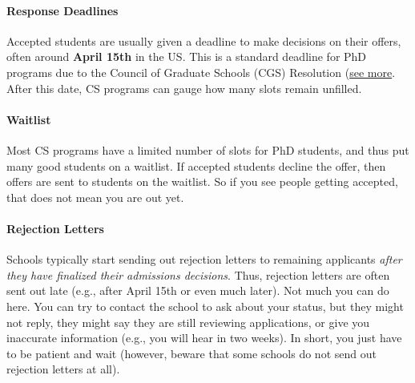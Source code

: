 \documentclass[oneside,11pt,dvipsnames]{book}
\begin{document}
\paragraph{Response Deadlines} Accepted students are usually given a deadline to make decisions on their offers, often around \textbf{April 15th} in the US. This is a standard deadline for PhD programs due to the Council of Graduate Schools (CGS) Resolution (\href{https://cgsnet.org/wp-content/uploads/2024/01/CGS_April15_Resolution_Jan312024.pdf}{see more}. After this date, CS programs can gauge how many slots remain unfilled.

\paragraph{Waitlist} Most CS programs have a limited number of slots for PhD students, and thus put many good students on a waitlist.  If accepted students decline the offer, then offers are sent to students on the waitlist. So if you see people getting accepted, that does not mean you are out yet.

\paragraph{Rejection Letters} Schools typically start sending out rejection letters to remaining applicants \emph{after they have finalized their admissions decisions}. Thus, rejection letters are often sent out late (e.g., after April 15th or even much later). Not much you can do here. You can try to contact the school to ask about your status, but they might not reply, they might say they are still reviewing applications, or give you inaccurate information (e.g., you will hear in two weeks). In short, you just have to be patient and wait (however, beware that some schools do not send out rejection letters at all).



\end{document}
